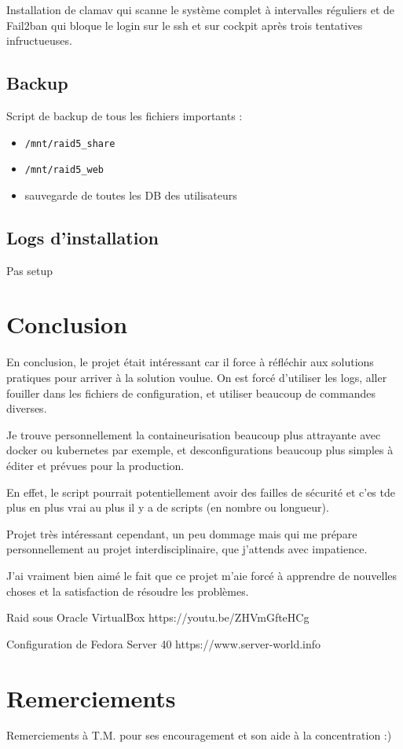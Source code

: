\documentclass{article}
\begin{document}
Installation de clamav qui scanne le système complet à intervalles réguliers et de Fail2ban qui bloque le login sur le ssh et sur cockpit après trois tentatives infructueuses.

\subsection{Backup}

Script de backup de tous les fichiers importants :

\begin{itemize}
\item \texttt{/mnt/raid5\_share}
\item \texttt{/mnt/raid5\_web}
\item sauvegarde de toutes les DB des utilisateurs
\end{itemize}

\subsection{Logs d'installation}

Pas setup

\pagebreak

	\newpage
	\section{Conclusion}

En conclusion, le projet était intéressant car il force à réfléchir aux solutions pratiques pour arriver à la solution voulue. On est forcé d'utiliser les logs, aller fouiller dans les fichiers de configuration, et utiliser beaucoup de commandes diverses.

Je trouve personnellement la containeurisation beaucoup plus attrayante avec docker ou kubernetes par exemple, et desconfigurations beaucoup plus simples à éditer et prévues pour la production.

En effet, le script pourrait potentiellement avoir des failles de sécurité et c'es tde plus en plus vrai au plus il y a de scripts (en nombre ou longueur).

Projet très intéressant cependant, un peu dommage mais qui me prépare personnellement au projet interdisciplinaire, que j'attends avec impatience.

J'ai vraiment bien aimé le fait que ce projet m'aie forcé à apprendre de nouvelles choses et la satisfaction de résoudre les problèmes.

	\begin{thebibliography}{9}
		
		Raid sous Oracle VirtualBox 
		https://youtu.be/ZHVmGfteHCg
		
		Configuration de Fedora Server 40
		https://www.server-world.info
		
	\end{thebibliography}

	\section*{Remerciements}
	
	Remerciements à T.M. pour ses encouragement et son aide à la concentration :)
\end{document}

